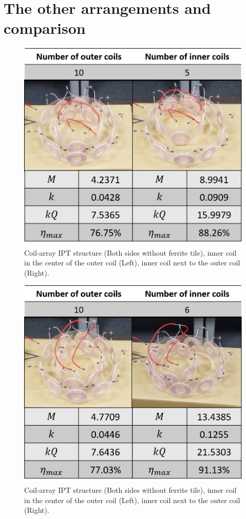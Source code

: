 \section{The other arrangements and comparison}
\begin{figure}[!b]
    \centering
    \includegraphics[width=0.6\linewidth]{images/4_coil_5_10_without_ferrite.png}
    \caption{Coil-array IPT structure (Both sides without ferrite tile), inner coil in the center of the outer coil (Left), inner coil next to the outer coil (Right).}
\end{figure}
\begin{figure}[!t]
    \centering
    \includegraphics[width=0.6\linewidth]{images/4_coil_6_10_without_ferrite.png}
    \caption{Coil-array IPT structure (Both sides without ferrite tile), inner coil in the center of the outer coil (Left), inner coil next to the outer coil (Right).}
\end{figure}
